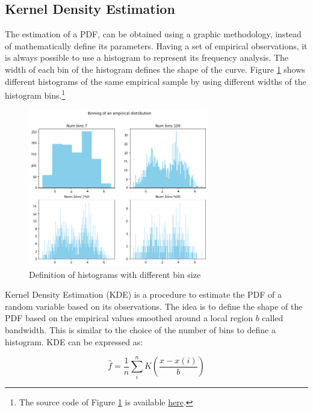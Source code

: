 \subsection{Kernel Density Estimation} \label{secKernelDensityEstimation}
The estimation of a PDF, can be obtained using a graphic methodology, instead of mathematically define its parameters. Having a set of empirical observations, it is always possible to use a histogram to represent its frequency analysis. The width of each bin of the histogram defines the shape of the curve. Figure \ref{fig_empiricalBinning} shows different histograms of the same empirical sample by using different widths of the histogram bins.\footnote{The source code of Figure \ref{fig_empiricalBinning} is available \href{https://github.com/aletuf93/logproj/blob/master/examples/03.\%20Statistics.ipynb}{here}.
}

\begin{figure}[hbt!]
\centering
\includegraphics[width=0.7\textwidth]{SectionLetsMath/elemStat_figures/fig_empiricalBinning.png}
\captionsetup{type=figure}
\caption{Definition of histograms with different bin size}
\label{fig_empiricalBinning}
\end{figure}

Kernel Density Estimation (KDE) is a procedure to estimate the PDF of a random variable based on its observations. The idea is to define the shape of the PDF based on the empirical values smoothed around a local region $b$ called bandwidth. This is similar to the choice of the number of bins to define a histogram. KDE can be expressed as:

\begin{equation}
\hat{f}=\frac{1}{n}\sum_{i}^{n}K\left(\frac{x-x(i)}{b}\right)
\label{eq_KDE}
\end{equation}

